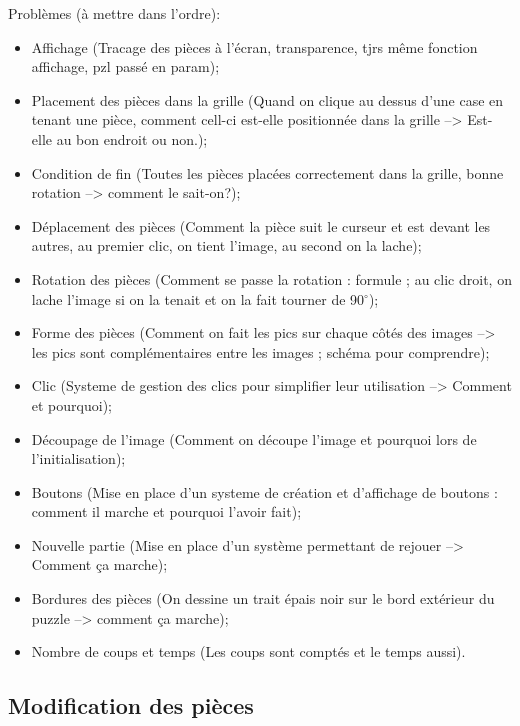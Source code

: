 \documentclass[]{article}
\begin{document}
Problèmes (à mettre dans l'ordre):
\begin{itemize}
	\item
		Affichage (Tracage des pièces à l'écran, transparence, tjrs même fonction affichage, pzl passé en param);
	\item
		Placement des pièces dans la grille (Quand on clique au dessus d'une case en tenant une pièce, comment cell-ci est-elle positionnée dans la grille --> Est-elle au bon endroit ou non.);
	\item
		Condition de fin (Toutes les pièces placées correctement dans la grille, bonne rotation --> comment le sait-on?);
	\item
		Déplacement des pièces (Comment la pièce suit le curseur et est devant les autres, au premier clic, on tient l'image, au second on la lache);
	\item
		Rotation des pièces (Comment se passe la rotation : formule ; au clic droit, on lache l'image si on la tenait et on la fait tourner de 90$^\circ$);
	 \item
		Forme des pièces (Comment on fait les pics sur chaque côtés des images --> les pics sont complémentaires entre les images ; schéma pour comprendre);
	\item
		Clic (Systeme de gestion des clics pour simplifier leur utilisation --> Comment et pourquoi);
	\item
		Découpage de l'image (Comment on découpe l'image et pourquoi lors de l'initialisation);
	\item
		Boutons (Mise en place d'un systeme de création et d'affichage de boutons : comment il marche et pourquoi l'avoir fait);
	\item
		Nouvelle partie (Mise en place d'un système permettant de rejouer --> Comment ça marche);
	\item
		Bordures des pièces (On dessine un trait épais noir sur le bord extérieur du puzzle --> comment ça marche);
	\item
		Nombre de coups et temps (Les coups sont comptés et le temps aussi).
\end{itemize}


\subsection{Modification des pièces}
\end{document}
